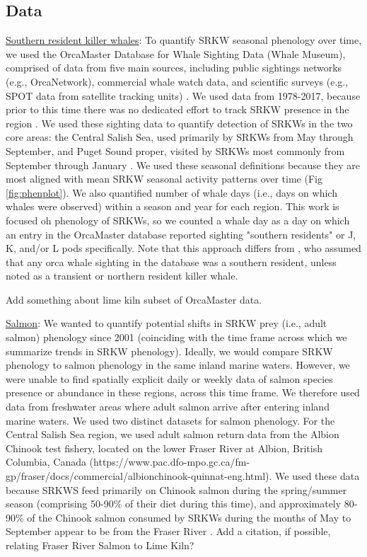 \documentclass{article}
\begin{document}
\subsection* {Data}
\par \underline{Southern resident killer whales}: To quantify SRKW seasonal phenology over time, we used the OrcaMaster Database for Whale Sighting Data (Whale Museum), comprised of data from five main sources, including public sightings networks (e.g., OrcaNetwork), commercial whale watch data, and scientific surveys (e.g., SPOT data from satellite tracking units) \citep{olson2018}. We used data from 1978-2017, because prior to this time there was no dedicated effort to track SRKW presence in the region \citep{olson2018}. We used these sighting data to quantify %
detection of SRKWs in the two core areas: the Central Salish Sea, used primarily by SRKWs from May through September, and Puget Sound proper, visited by SRKWs most commonly from September through January \citep[Fig. 1][]{olson2018}. We used these seasonal definitions because they are most aligned with mean SRKW seasonal activity patterns over time (Fig \ref{fig:phenplot}).  We also quantified number of whale days (i.e., days on which whales were observed) within a season and year for each region. This work is focused oh phenology of SRKWs, so we counted a whale day as a day on which an entry in the OrcaMaster database reported sighting "southern residents" or J, K, and/or L pods specifically. Note that this approach differs from \citet{olson2018}, who assumed that any orca whale sighting in the database was a southern resident, unless noted as a transient or northern resident killer whale.  
\par Add something about lime kiln subset of OrcaMaster data.
\par \underline{Salmon}: We wanted to quantify potential shifts in SRKW prey (i.e., adult salmon) phenology since 2001 (coinciding with the time frame across which we summarize trends in SRKW phenology). Ideally, we would compare SRKW phenology to salmon phenology in the same inland marine waters. However, we were unable to find spatially explicit daily or weekly data of salmon species presence or abundance in these regions, across this time frame. We therefore used data from freshwater areas where adult salmon arrive after entering inland marine waters. We used two distinct datasets for salmon phenology. For the Central Salish Sea region, we used adult salmon return data from the Albion Chinook test fishery, located  on the lower Fraser River at Albion, British Columbia, Canada (https://www.pac.dfo-mpo.gc.ca/fm-gp/fraser/docs/commercial/albionchinook-quinnat-eng.html). We used these data because SRKWS feed primarily on Chinook salmon during the spring/summer season (comprising 50-90\% of their diet during this time), and approximately 80-90\% of the Chinook salmon consumed by SRKWs during the months of May to September appear to be from the Fraser River \citep{hanson2010}. Add a citation, if possible, relating Fraser River Salmon to Lime Kiln?
\end{document}
